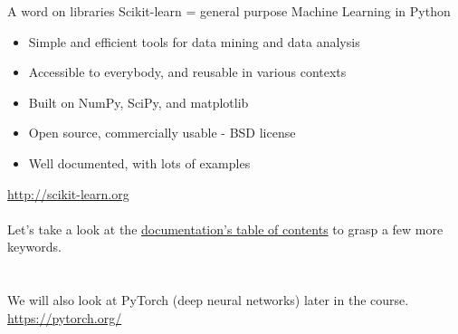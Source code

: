 \documentclass[10pt,a4paper,t,aspectratio=1610,dvipsnames]{beamer}
\begin{document}
\begin{frame}{A word on libraries}
Scikit-learn = general purpose Machine Learning in Python
\begin{itemize}
\item Simple and efficient tools for data mining and data analysis
\item Accessible to everybody, and reusable in various contexts
\item Built on NumPy, SciPy, and matplotlib
\item Open source, commercially usable - BSD license
\item Well documented, with lots of examples
\end{itemize}
\url{http://scikit-learn.org}\\
~\\
Let's take a look at the \href{http://scikit-learn.org/stable/user_guide.html}{documentation's table of contents} to grasp a few more keywords.\\
~\\
~\\
We will also look at PyTorch (deep neural networks) later in the course.\\
\url{https://pytorch.org/}
\end{frame}
\end{document}
